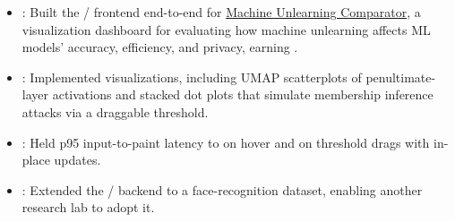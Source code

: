 \begin{itemize}
  \item {}: Built the / frontend end-to-end for \href{https://gnueaj.github.io/Machine-Unlearning-Comparator/}{Machine Unlearning Comparator}, a visualization dashboard for evaluating how machine unlearning affects ML models' accuracy, efficiency, and privacy, earning .
  \item {}: Implemented  visualizations, including  UMAP scatterplots of penultimate-layer activations and  stacked dot plots that simulate membership inference attacks via a draggable threshold.
  \item {}: Held p95 input-to-paint latency to  on hover and  on threshold drags with in-place  updates.
  \item {}: Extended the / backend to a face-recognition dataset, enabling another research lab to adopt it.
\end{itemize}
